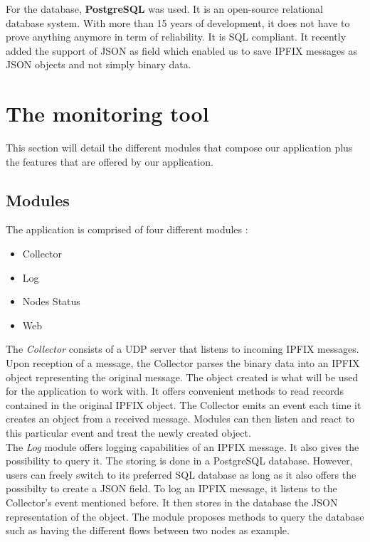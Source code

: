 For the database, \textbf{PostgreSQL} \cite{website:postgresql} was used. It is an open-source relational database system. With more than 15 years of development, it does not have to prove anything anymore in term of reliability. It is SQL compliant. It recently added the support of JSON as field which enabled us to save IPFIX messages as JSON objects and not simply binary data.

\section{The monitoring tool}

This section will detail the different modules that compose our application plus the features that are offered by our application.

\subsection{Modules}

The application is comprised of four different modules :
\begin{itemize}
	\item Collector
	\item Log
	\item Nodes Status
	\item Web \\
\end{itemize}

The \textit{Collector} consists of a UDP server that listens to incoming IPFIX messages. Upon reception of a message, the Collector parses the binary data into an IPFIX object representing the original message. The object created is what will be used for the application to work with. It offers convenient methods to read records contained in the original IPFIX object. The Collector emits an event each time it creates an object from a received message. Modules can then listen and react to this particular event and treat the newly created object. \\

The \textit{Log} module offers logging capabilities of an IPFIX message. It also gives the possibility to query it. The storing is done in a PostgreSQL database. However, users can freely switch to its preferred SQL database as long as it also offers the possibilty to create a JSON field. To log an IPFIX message, it listens to the Collector's event mentioned before. It then stores in the database the JSON representation of the object. The module proposes methods to query the database such as having the different flows between two nodes as example. \\


